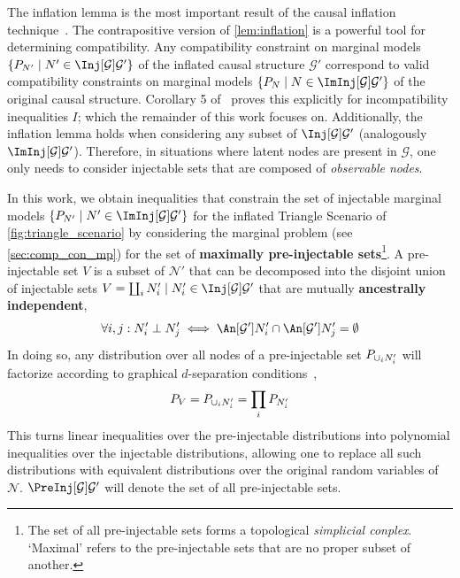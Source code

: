\documentclass[aps, 10pt, english, twoside, pra, nofootinbib, longbibliography]{revtex4-1}
\theoremstyle{plain}
\theoremstyle{definition}
\theoremstyle{remark}
\newcommand{\graph}{\mathcal{G}}
\newcommand{\nodes}{\mathcal{N}}
\newcommand{\ancestralindep}{\perp}
\newcommand{\term}[1]{\textcolor{Mahogany}{\textbf{#1}}}
\begin{document}
    The inflation lemma is the most important result of the causal inflation technique~\cite{Inflation}. The contrapositive version of \cref{lem:inflation} is a powerful tool for determining compatibility. Any compatibility constraint on marginal models $\bc{\prob[N'] \mid N' \in \Inj[\graph]{\graph'}}$ of the inflated causal structure $\graph'$ correspond to valid compatibility constraints on marginal models $\bc{\prob[N] \mid N \in \ImInj[\graph]{\graph'}}$ of the original causal structure. Corollary 5 of~\cite{Inflation} proves this explicitly for incompatibility inequalities $I$; which the remainder of this work focuses on.  Additionally, the inflation lemma holds when considering any subset of $\Inj[\graph]{\graph'}$ (analogously $\ImInj[\graph]{\graph'}$). Therefore, in situations where latent nodes are present in $\graph$, one only needs to consider injectable sets that are composed of \textit{observable nodes}.

    In this work, we obtain inequalities that constrain the set of injectable marginal models $\bc{\prob[N'] \mid N' \in \ImInj[\graph]{\graph'}}$ for the inflated Triangle Scenario of \cref{fig:triangle_scenario} by considering the marginal problem (see \cref{sec:comp_con_mp}) for the set of \term{maximally pre-injectable sets}\footnote{The set of all pre-injectable sets forms a topological \textit{simplicial conplex}. `Maximal' refers to the pre-injectable sets that are no proper subset of another.}. A pre-injectable set $V$ is a subset of $\nodes'$ that can be decomposed into the disjoint union of injectable sets $V = \coprod_i N'_i \mid N'_i \in \Inj[\graph]{\graph'}$ that are mutually \term{ancestrally independent},
    \[ \forall i,j : N'_i \ancestralindep N'_j \iff \An[\graph']{N'_i} \cap \An[\graph']{N'_j} = \emptyset  \]
    In doing so, any distribution over all nodes of a pre-injectable set $\prob[\cup_i N'_i]$ will factorize according to graphical $d$-separation conditions~\cite{Pearl_2009},
    \[ \prob[V] = \prob[\cup_i N'_i] = \prod_{i}\prob[N'_i] \]
    This turns linear inequalities over the pre-injectable distributions into polynomial inequalities over the injectable distributions, allowing one to replace all such distributions with equivalent distributions over the original random variables of $\nodes$. $\PreInj[\graph]{\graph'}$ will denote the set of all pre-injectable sets.
\end{document}
